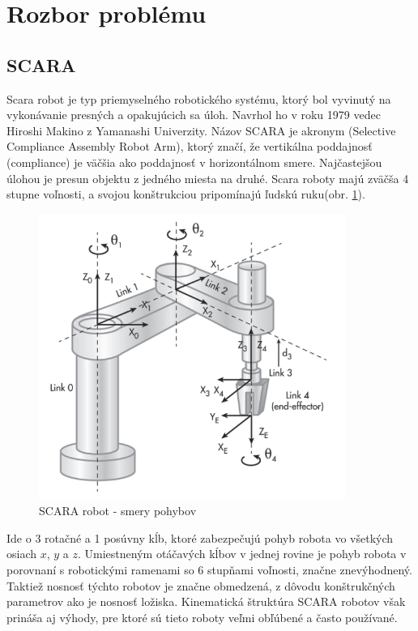 
\section{Rozbor problému}
\label{kap:1}

\subsection{SCARA}
\label{kap:1.1}

Scara robot je typ priemyselného robotického systému, ktorý bol vyvinutý na vykonávanie presných a opakujúcich sa úloh. Navrhol ho v roku 1979 vedec Hiroshi Makino z Yamanashi Univerzity\cite{}. Názov SCARA je akronym (Selective Compliance Assembly Robot Arm), ktorý značí, že vertikálna poddajnosť (compliance) je väčšia ako poddajnosť v horizontálnom smere. Najčastejšou úlohou je presun objektu z jedného miesta na druhé. Scara roboty majú zväčša 4 stupne voľnosti, a svojou konštrukciou pripomínajú ľudskú ruku(obr. \ref{OBRAZOK 1.1}).
\begin{figure}[h]
	\centering
	\includegraphics[width=100mm]{img/SCARA1.png}
	\caption{SCARA robot - smery pohybov\cite{}}\label{OBRAZOK 1.1} 
\end{figure} 
Ide o 3 rotačné a 1 posúvny kĺb, ktoré zabezpečujú pohyb robota vo všetkých osiach $x$, $y$ a $z$. Umiestneným otáčavých kĺbov v jednej rovine je pohyb robota v porovnaní s robotickými ramenami so 6 stupňami voľnosti, značne  znevýhodnený. Taktiež nosnosť týchto robotov je značne obmedzená, z dôvodu konštrukčných parametrov ako je nosnosť ložiska. Kinematická štruktúra SCARA robotov však prináša aj výhody, pre ktoré sú tieto roboty veľmi obľúbené a často používané.

